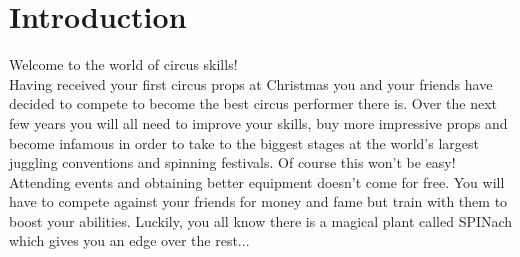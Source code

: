 \chapter*{Introduction}
Welcome to the world of circus skills!\\
Having received your first circus props at Christmas you and your friends have decided to compete to become the best circus performer there is.
Over the next few years you will all need to improve your skills, buy more impressive props and become infamous in order to take to the biggest stages at the world's largest juggling conventions and spinning festivals.
Of course this won't be easy!
Attending events and obtaining better equipment doesn't come for free. 
You will have to compete against your friends for money and fame but train with them to boost your abilities.
Luckily, you all know there is a magical plant called SPINach which gives you an edge over the rest...